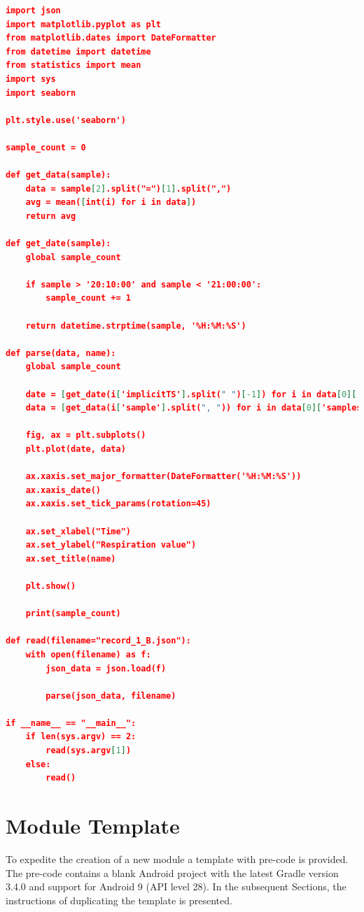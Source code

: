 \begin{lstlisting}[language=json, caption={My Caption}, captionpos=b]
import json
import matplotlib.pyplot as plt
from matplotlib.dates import DateFormatter
from datetime import datetime
from statistics import mean
import sys 
import seaborn

plt.style.use('seaborn')

sample_count = 0

def get_data(sample):
    data = sample[2].split("=")[1].split(",")
    avg = mean([int(i) for i in data])
    return avg

def get_date(sample):
    global sample_count

    if sample > '20:10:00' and sample < '21:00:00':
        sample_count += 1

    return datetime.strptime(sample, '%H:%M:%S')

def parse(data, name):
    global sample_count

    date = [get_date(i['implicitTS'].split(" ")[-1]) for i in data[0]['samples']]
    data = [get_data(i['sample'].split(", ")) for i in data[0]['samples']]

    fig, ax = plt.subplots()
    plt.plot(date, data)

    ax.xaxis.set_major_formatter(DateFormatter('%H:%M:%S'))
    ax.xaxis_date()
    ax.xaxis.set_tick_params(rotation=45)

    ax.set_xlabel("Time")
    ax.set_ylabel("Respiration value")
    ax.set_title(name)

    plt.show()
    
    print(sample_count)

def read(filename="record_1_B.json"):
    with open(filename) as f:
        json_data = json.load(f)

        parse(json_data, filename)

if __name__ == "__main__":
    if len(sys.argv) == 2:
        read(sys.argv[1])
    else:
        read()
\end{lstlisting}


\chapter{Module Template}
To expedite the creation of a new module a template with pre-code is provided. The pre-code contains a blank Android project with the latest Gradle version 3.4.0 and support for Android 9 (API level 28). In the subsequent Sections, the instructions of duplicating the template is presented. 




